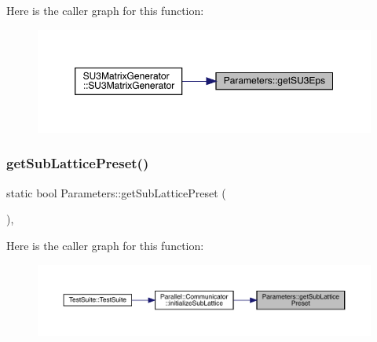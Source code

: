 Here is the caller graph for this function\+:\nopagebreak
\begin{figure}[H]
\begin{center}
\leavevmode
\includegraphics[width=350pt]{class_parameters_ac14d1b11099fdfa254fb138d4471ceb2_icgraph}
\end{center}
\end{figure}
\mbox{\label{class_parameters_ab9d9f206373cdad11d48ab08222204e3}} 
\subsubsection{\texorpdfstring{getSubLatticePreset()}{getSubLatticePreset()}}
{\footnotesize\ttfamily static bool Parameters\+::get\+Sub\+Lattice\+Preset (\begin{DoxyParamCaption}{ }\end{DoxyParamCaption})\hspace{0.3cm}{\ttfamily [inline]}, {\ttfamily [static]}}

Here is the caller graph for this function\+:\nopagebreak
\begin{figure}[H]
\begin{center}
\leavevmode
\includegraphics[width=350pt]{class_parameters_ab9d9f206373cdad11d48ab08222204e3_icgraph}
\end{center}
\end{figure}
\mbox{\label{class_parameters_aff629ab94d99807364926008fb4e1e67}} 
